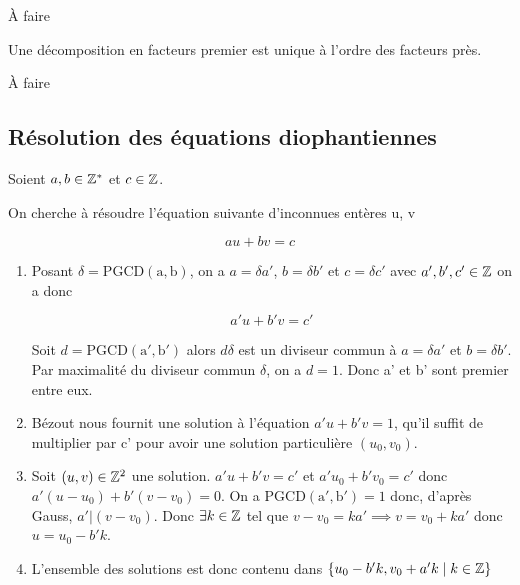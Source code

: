\documentclass[a4paper, 12pt]{article}
\begin{document}
\begin{demonstration}
    À faire
\end{demonstration}

\begin{proposition}
    Une décomposition en facteurs premier est unique à l'ordre des facteurs près.
\end{proposition}

\begin{demonstration}
    À faire
\end{demonstration}

\subsection{Résolution des équations diophantiennes}

Soient $a, b \in \mathbb{Z}^*$ et $c \in \mathbb{Z}$.

On cherche à résoudre l'équation suivante d'inconnues entères u, v

$$
au + bv = c
$$

\begin{methode}
    \begin{enumerate}
        \item Posant $\delta = \mathrm{PGCD(a, b)}$, on a $a = \delta a'$, $b = \delta b'$ et $c = \delta c'$ avec $a', b', c' \in \mathbb{Z}$
        on a donc
        
        $$
        a'u + b'v = c'
        $$
        
        Soit $d = \mathrm{PGCD(a', b')}$ alors $d\delta$ est un diviseur commun à $a = \delta a'$ et $b = \delta b'$.
        Par maximalité du diviseur commun $\delta$, on a $d = 1$. Donc a' et b' sont premier entre eux.
        \item Bézout nous fournit une solution à l'équation $a'u + b'v = 1$, qu'il suffit de multiplier
        par c' pour avoir une solution particulière $(u_0, v_0)$.
        \item Soit $(u, v) \in \mathbb{Z}^2$ une solution. $a'u + b'v = c'$ et $a'u_0 + b'v_0 = c'$ donc $a'(u - u_0) + b'(v - v_0) = 0$.
        On a $\mathrm{PGCD(a', b')}= 1$ donc, d'après Gauss, $a' | (v - v_0)$. Donc $\exists k \in \mathbb{Z}$ tel que $v - v_0 = ka' \implies v = v_0 + ka'$ donc $u = u_0 - b'k$.
        \item L'ensemble des solutions est donc contenu dans $\{u_0 - b'k, v_0 + a'k \mid k \in \mathbb{Z}\}$
    \end{enumerate}
\end{methode}
\end{document}
